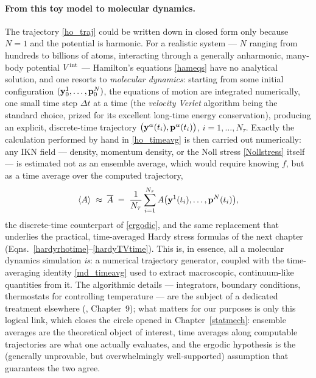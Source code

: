 \paragraph{From this toy model to molecular dynamics.} The trajectory \eqref{ho_traj} could be written down in closed form only because $N=1$ and the potential is harmonic. For a realistic system --- $N$ ranging from hundreds to billions of atoms, interacting through a generally anharmonic, many-body potential $V^{\rm int}$ --- Hamilton's equations \eqref{hameqs} have no analytical solution, and one resorts to \textit{molecular dynamics}: starting from some initial configuration $(\mathbf{y}^1_0,\ldots,\mathbf{p}^N_0)$, the equations of motion are integrated numerically, one small time step $\Delta t$ at a time (the \textit{velocity Verlet} algorithm being the standard choice, prized for its excellent long-time energy conservation), producing an explicit, discrete-time trajectory $\big(\mathbf{y}^\alpha(t_i),\mathbf{p}^\alpha(t_i)\big)$, $i=1,\ldots,N_\tau$. Exactly the calculation performed by hand in \eqref{ho_timeavg} is then carried out numerically: any IKN field --- density, momentum density, or the Noll stress \eqref{Nollstress} itself --- is estimated not as an ensemble average, which would require knowing $f$, but as a time average over the computed trajectory,
\begin{equation}\label{md_timeavg}
	\langle A\rangle \;\approx\; \overline{A} \;=\; \frac{1}{N_\tau}\sum_{i=1}^{N_\tau} A\big(\mathbf{y}^1(t_i),\ldots,\mathbf{p}^N(t_i)\big),
\end{equation}
the discrete-time counterpart of \eqref{ergodic}, and the same replacement that underlies the practical, time-averaged Hardy stress formulas of the next chapter (Eqns.~\eqref{hardyrhotime}--\eqref{hardyTVtime}). This is, in essence, all a molecular dynamics simulation \textit{is}: a numerical trajectory generator, coupled with the time-averaging identity \eqref{md_timeavg} used to extract macroscopic, continuum-like quantities from it. The algorithmic details --- integrators, boundary conditions, thermostats for controlling temperature --- are the subject of a dedicated treatment elsewhere (\cite{TadmorMiller}, Chapter~9); what matters for our purposes is only this logical link, which closes the circle opened in Chapter~\ref{statmech}: ensemble averages are the theoretical object of interest, time averages along computable trajectories are what one actually evaluates, and the ergodic hypothesis is the (generally unprovable, but overwhelmingly well-supported) assumption that guarantees the two agree.

